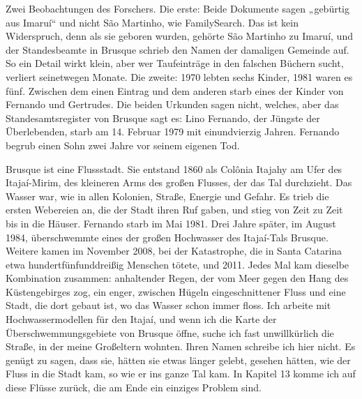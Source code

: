 \documentclass[
  ngerman,
  11pt,
  openany]{book}
\begin{document}
Zwei Beobachtungen des Forschers. Die erste: Beide Dokumente sagen
„gebürtig aus Imaruí`` und nicht São Martinho, wie FamilySearch. Das ist
kein Widerspruch, denn als sie geboren wurden, gehörte São Martinho zu
Imaruí, und der Standesbeamte in Brusque schrieb den Namen der damaligen
Gemeinde auf. So ein Detail wirkt klein, aber wer Taufeinträge in den
falschen Büchern sucht, verliert seinetwegen Monate. Die zweite: 1970
lebten sechs Kinder, 1981 waren es fünf. Zwischen dem einen Eintrag und
dem anderen starb eines der Kinder von Fernando und Gertrudes. Die
beiden Urkunden sagen nicht, welches, aber das Standesamtsregister von
Brusque sagt es: Lino Fernando, der Jüngste der Überlebenden, starb am
14. Februar 1979 mit einundvierzig Jahren. Fernando begrub einen Sohn
zwei Jahre vor seinem eigenen Tod.

Brusque ist eine Flussstadt. Sie entstand 1860 als Colônia Itajahy am
Ufer des Itajaí-Mirim, des kleineren Arms des großen Flusses, der das
Tal durchzieht. Das Wasser war, wie in allen Kolonien, Straße, Energie
und Gefahr. Es trieb die ersten Webereien an, die der Stadt ihren Ruf
gaben, und stieg von Zeit zu Zeit bis in die Häuser. Fernando starb im
Mai 1981. Drei Jahre später, im August 1984, überschwemmte eines der
großen Hochwasser des Itajaí-Tals Brusque. Weitere kamen im November
2008, bei der Katastrophe, die in Santa Catarina etwa
hundertfünfunddreißig Menschen tötete, und 2011. Jedes Mal kam dieselbe
Kombination zusammen: anhaltender Regen, der vom Meer gegen den Hang des
Küstengebirges zog, ein enger, zwischen Hügeln eingeschnittener Fluss
und eine Stadt, die dort gebaut ist, wo das Wasser schon immer floss.
Ich arbeite mit Hochwassermodellen für den Itajaí, und wenn ich die
Karte der Überschwemmungsgebiete von Brusque öffne, suche ich fast
unwillkürlich die Straße, in der meine Großeltern wohnten. Ihren Namen
schreibe ich hier nicht. Es genügt zu sagen, dass sie, hätten sie etwas
länger gelebt, gesehen hätten, wie der Fluss in die Stadt kam, so wie er
ins ganze Tal kam. In Kapitel 13 komme ich auf diese Flüsse zurück, die
am Ende ein einziges Problem sind.
\end{document}

